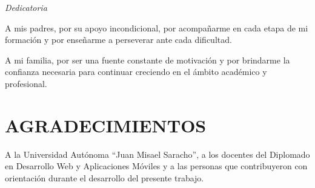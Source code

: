 	
	\clearpage
	
	\thispagestyle{plain}
	
	\vspace*{5cm}
	
	\hfill
	\begin{minipage}{0.58\textwidth}
		
		{\fontsize{27}{32}\selectfont\itshape Dedicatoria}
		
		\vspace{0.9cm}
		
		\raggedleft
		\large
		
		A mis padres, por su apoyo incondicional,
		por acompañarme en cada etapa de mi formación
		y por enseñarme a perseverar ante cada dificultad.
		
		A mi familia, por ser una fuente constante de
		motivación y por brindarme la confianza necesaria
		para continuar creciendo en el ámbito académico
		y profesional.
		
	\end{minipage}
	
	\chapter*{AGRADECIMIENTOS}
	
	
	A la Universidad Autónoma ``Juan Misael Saracho'', a los docentes
	del Diplomado en Desarrollo Web y Aplicaciones Móviles y a las
	personas que contribuyeron con orientación durante el desarrollo
	del presente trabajo.
	
	
	
	\clearpage
	\tableofcontents
	
	\clearpage
	\listoftables
	
	\clearpage
	\listoffigures
	
	\clearpage
	\listofanexo
	
	
	
